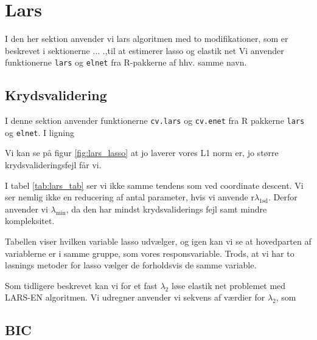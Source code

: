 \section{Lars}
I den her sektion anvender vi lars algoritmen med to modifikationer, som er beskrevet i sektionerne ... .,til at estimerer lasso og elastik net
Vi anvender funktionerne \texttt{lars} og \texttt{elnet} fra R-pakkerne af hhv. samme navn.

\subsection{Krydsvalidering}
I denne sektion anvender funktionerne  \texttt{cv.lars} og \texttt{cv.enet} fra R pakkerne \texttt{lars} og \texttt{elnet}. 
I ligning 

Vi kan se på figur \ref{fig:lars_lasso} at jo laverer vores L1 norm er, jo større krydsvalideringsfejl får vi.  


I tabel \ref{tab:lars_tab} ser vi ikke samme tendens som ved coordinate descent. 
Vi ser nemlig ikke en reducering af antal parameter, hvis vi anvende r$\lambda_{1\text{sd}}$.
Derfor anvender vi $\lambda_{\min}$, da den har mindst krydsvaliderings fejl samt mindre kompleksitet. 





Tabellen viser hvilken variable lasso udvælger, og igen kan vi se at hovedparten af variablerne er i samme gruppe, som vores responsvariable. 
Trods, at vi har to løsnings metoder for lasso vælger de forholdsvis de samme variable.



Som tidligere beskrevet kan vi for et fast $\lambda_2$ løse elastik net problemet med LARS-EN algoritmen. 
Vi udregner
anvender vi sekvens af værdier for $\lambda_2$, som 

\subsection{BIC}